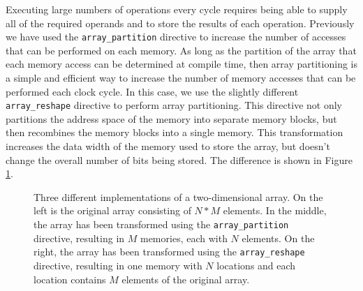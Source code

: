 Executing large numbers of operations every cycle requires being able to supply all of the required operands and to store the results of each operation.   Previously we have used the \lstinline{array_partition} directive to increase the number of accesses that can be performed on each memory.  As long as the partition of the array that each memory access can be determined at compile time, then array partitioning is a simple and efficient way to increase the number of memory accesses that can be performed each clock cycle.  In this case, we use the slightly different \lstinline{array_reshape} directive to perform array partitioning.  This directive not only partitions the address space of the memory into separate memory blocks, but then recombines the memory blocks into a single memory.  This transformation increases the data width of the memory used to store the array, but doesn't change the overall number of bits being stored.  The difference is shown in Figure \ref{fig:matmul_array_reshape}.

\begin{figure}
\centering
{\tiny }
\caption{Three different implementations of a two-dimensional array.  On the left is the original array consisting of $N*M$ elements.  In the middle, the array has been transformed using the \lstinline{array_partition} directive, resulting in $M$ memories, each with $N$ elements.  On the right, the array has been transformed using the \lstinline{array_reshape} directive, resulting in one memory with $N$ locations and each location contains $M$ elements of the original array.}
\label{fig:matmul_array_reshape}
\end{figure}

